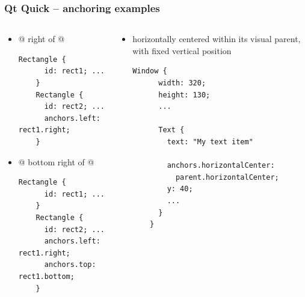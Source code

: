 \begin{frame}[fragile]
  \frametitle{Qt Quick -- anchoring examples}
    \footnotesize
    \begin{columns}
      \begin{column}{0.55\textwidth}
      \begin{itemize}
        \item {}@ right of @
        \begin{lstlisting}[basicstyle=\scriptsize\ttfamily]
	Rectangle {
	  id: rect1; ...
	}
	Rectangle {
	  id: rect2; ...
	  anchors.left: rect1.right;
	}
        \end{lstlisting}
        \item {}@ bottom right of @
        \begin{lstlisting}[basicstyle=\scriptsize\ttfamily]
	Rectangle {
	  id: rect1; ...
	}
	Rectangle {
	  id: rect2; ...
	  anchors.left: rect1.right;
	  anchors.top: rect1.bottom;
	}
        \end{lstlisting}
      \end{itemize}
      \end{column}
      \begin{column}{0.45\textwidth}
      \begin{itemize}
        \item \verb@Text@ horizontally centered within its visual parent,
          with fixed vertical position
        \begin{lstlisting}[basicstyle=\tiny\ttfamily]
	Window {
	  width: 320;
	  height: 130;
	  ...

	  Text {
	    text: "My text item"

	    anchors.horizontalCenter:
	      parent.horizontalCenter;
	    y: 40;
	    ...
	  }
	}
        \end{lstlisting}
      \end{itemize}
      \end{column}
    \end{columns}
\end{frame}

